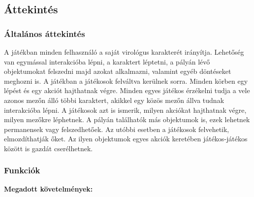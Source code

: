 \subsection{Áttekintés}

\subsubsection{Általános áttekintés}

A játékban minden felhasználó a saját virológus karakterét irányítja. Lehetőség van egymással interakcióba lépni, a karaktert léptetni, a pályán lévő objektumokat felszedni majd azokat alkalmazni, valamint egyéb döntéseket meghozni is.
A játékban a játékosok felváltva kerülnek sorra. Minden körben egy lépést és egy akciót hajthatnak végre. Minden egyes játékos érzékelni tudja a vele azonos mezőn álló többi karaktert, akikkel egy közös mezőn állva tudnak interakcióba lépni. A játékosok azt is ismerik, milyen akciókat hajthatnak végre, milyen mezőkre léphetnek.
A pályán találhatók más objektumok is, ezek lehetnek permanensek vagy felszedhetőek. Az utóbbi esetben a játékosok felvehetik, elmozdíthatják őket. Az ilyen objektumok egyes akciók keretében játékos-játékos között is gazdát cserélhetnek.

\subsubsection{Funkciók}

\textbf{Megadott követelmények:}

